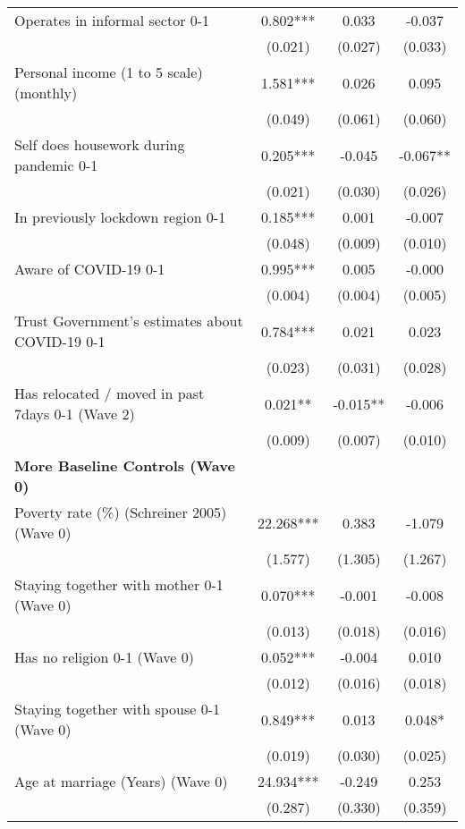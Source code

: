 \begin{ThreePartTable}
\begin{table}[tbp]
\begin{tabular}{lccc}
 Operates in informal sector 0-1 & 0.802*** & 0.033 & -0.037 \\ [0.1em] 
                   &      (0.021)     &      (0.027)     &      (0.033)     \\ [0.1em] 
 Personal income (1 to 5 scale) (monthly) & 1.581*** & 0.026 & 0.095 \\ [0.1em] 
                   &      (0.049)     &      (0.061)     &      (0.060)     \\ [0.1em] 
 Self does housework during pandemic 0-1 & 0.205*** & -0.045 & -0.067** \\ [0.1em] 
                   &      (0.021)     &      (0.030)     &      (0.026)     \\ [0.1em] 
 In previously lockdown region 0-1 & 0.185*** & 0.001 & -0.007 \\ [0.1em] 
                   &      (0.048)     &      (0.009)     &      (0.010)     \\ [0.1em] 
 Aware of COVID-19 0-1 & 0.995*** & 0.005 & -0.000 \\ [0.1em] 
                   &      (0.004)     &      (0.004)     &      (0.005)     \\ [0.1em] 
 Trust Government's estimates about COVID-19 0-1 & 0.784*** & 0.021 & 0.023 \\ [0.1em] 
                   &      (0.023)     &      (0.031)     &      (0.028)     \\ [0.1em] 
 Has relocated / moved in past 7days 0-1 (Wave 2) & 0.021** & -0.015** & -0.006 \\ [0.1em] 
                   &      (0.009)     &      (0.007)     &      (0.010)     \\ [0.1em] 
\textbf{More Baseline Controls (Wave 0)} & & & \\ 
 Poverty rate (\%) (Schreiner 2005) (Wave 0) & 22.268*** & 0.383 & -1.079 \\ [0.1em] 
                   &      (1.577)     &      (1.305)     &      (1.267)     \\ [0.1em] 
 Staying together with mother 0-1 (Wave 0) & 0.070*** & -0.001 & -0.008 \\ [0.1em] 
                   &      (0.013)     &      (0.018)     &      (0.016)     \\ [0.1em] 
 Has no religion 0-1 (Wave 0) & 0.052*** & -0.004 & 0.010 \\ [0.1em] 
                   &      (0.012)     &      (0.016)     &      (0.018)     \\ [0.1em] 
 Staying together with spouse 0-1 (Wave 0) & 0.849*** & 0.013 & 0.048* \\ [0.1em] 
                   &      (0.019)     &      (0.030)     &      (0.025)     \\ [0.1em] 
 Age at marriage (Years) (Wave 0) & 24.934*** & -0.249 & 0.253 \\ [0.1em] 
                   &      (0.287)     &      (0.330)     &      (0.359)     \\ [0.1em] 
\hline\hline
\end{tabular}
\insertTableNotes
\end{table}
\end{ThreePartTable}
